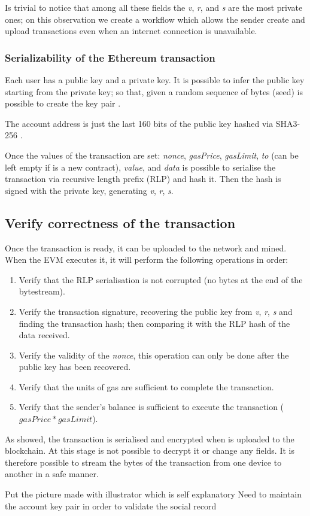 Is trivial to notice that among all these fields the \textit{v}, \textit{r}, and \textit{s} are the most private ones; on this observation we create a workflow which allows the sender create and upload transactions even when an internet connection is unavailable. 

\subsubsection{Serializability of the Ethereum transaction}
Each user has a public key and a private key. It is possible to infer the public key starting from the private key; so that, given a random sequence of bytes (seed) is possible to create the key pair \cite{_encryption_KeyPair}.

The account address is just the last 160 bits of the public key hashed via SHA3-256 \cite{sha3_256_keccak}.

Once the values of the transaction are set: \textit{nonce}, \textit{gasPrice}, \textit{gasLimit}, \textit{to} (can be left empty if is a new contract), \textit{value}, and \textit{data} is possible to serialise the transaction via recursive length prefix (RLP) \cite{ethereum_whitepaper} and hash it. Then the hash is signed with the private key, generating \textit{v}, \textit{r}, \textit{s}.

\subsection{Verify correctness of the transaction}
Once the transaction is ready, it can be uploaded to the network and mined. When the EVM executes it, it will perform the following operations in order:
\begin{enumerate}
  \item Verify that the RLP serialisation is not corrupted (no bytes at the end of the bytestream).
  \item Verify the transaction signature, recovering the public key from \textit{v}, \textit{r}, \textit{s} and finding the transaction hash; then comparing it with the RLP hash of the data received.
  \item Verify the validity of the \textit{nonce}, this operation can only be done after the public key has been recovered.
  \item Verify that the units of gas are sufficient to complete the transaction.
  \item Verify that the sender's balance is sufficient to execute the transaction ($gasPrice * gasLimit$).
\end{enumerate}

As showed, the transaction is serialised and encrypted when is uploaded to the blockchain.
At this stage is not possible to decrypt it or change any fields. It is therefore possible to stream the bytes of the transaction from one device to another in a safe manner.


\begin{notation}
  Put the picture made with illustrator which is self explanatory
  Need to maintain the account key pair in order to validate the social record
\end{notation}
